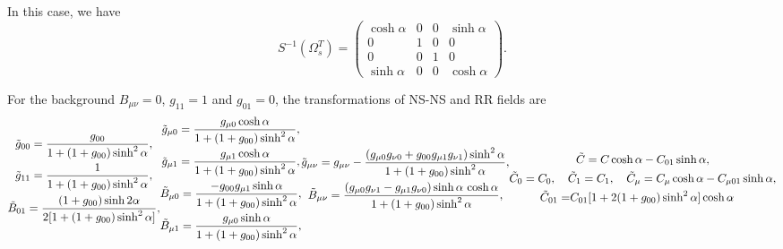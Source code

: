 \documentclass[a4paper,12pt]{article}
\begin{document}
In this case, we have 
\begin{equation}
\label{soluex4b}
S^{-1}(\Omega^T_s)=\begin{pmatrix}
\cosh\alpha & 0 & 0 &\sinh\alpha\\
0 & 1 & 0 & 0\\
0 & 0 & 1 & 0\\
\sinh\alpha & 0 & 0 &\cosh\alpha
\end{pmatrix}.
\end{equation}

For the background $B_{\mu\nu}=0$, $g_{11}=1$ and
$g_{01}=0$, the transformations of NS-NS
and RR fields are
\begin{subequations}
\begin{gather}
\label{gtransfa}
{\tilde g}_{00}={g_{00}\over 1+(1+g_{00})\sinh^2\alpha},\\
\label{gtransfb}
{\tilde g}_{11}={1\over 1+(1+g_{00})\sinh^2\alpha},\\
\label{atransfa}
{\tilde B}_{01}={(1+g_{00})\sinh 2\alpha\over 
2[1+(1+g_{00})\sinh^2\alpha]},
\end{gather}
\begin{gather}
\label{gtransfc}
{\tilde g}_{\mu 0}={g_{\mu 0} \cosh\alpha \over
1+(1+g_{00})\sinh^2\alpha},\\
\label{gtransfd}
{\tilde g}_{\mu 1}={g_{\mu 1} \cosh\alpha \over
1+(1+g_{00})\sinh^2\alpha},\\
\label{atransfb}
{\tilde B}_{\mu 0}={-g_{00}g_{\mu 1}\sinh\alpha
\over 1+(1+g_{00})\sinh^2\alpha},\\
\label{atransff}
{\tilde B}_{\mu 1}={g_{\mu 0}\sinh\alpha\over 
1+(1+g_{00})\sinh^2\alpha},
\end{gather}
\begin{gather}
\label{gtransfe}
{\tilde g}_{\mu\nu}=g_{\mu\nu}-{(g_{\mu 0}
g_{\nu 0}+g_{00}g_{\mu 1}g_{\nu 1})\sinh^2\alpha
\over
1+(1+g_{00})\sinh^2\alpha},\\
\label{atransfc}
{\tilde B}_{\mu\nu}={(g_{\mu 0}g_{\nu 1}
-g_{\mu 1}g_{\nu 0})\sinh\alpha\,\cosh\alpha
\over
1+(1+g_{00})\sinh^2\alpha},
\end{gather}
\begin{gather}
\label{ctransfa}
{\tilde C}=C\cosh\alpha-C_{01}\sinh\alpha,\\
\label{ctransfb}
{\tilde C}_0=C_0,\quad
{\tilde C}_1=C_1,\quad
{\tilde C}_\mu=C_\mu\cosh\alpha-C_{\mu 01}\sinh\alpha,\\
\label{ctransfc}
\begin{split}
{\tilde C}_{01}=& {C_{01}[1+2(1+g_{00})\sinh^2\alpha]\cosh\alpha
}
\end{split}
\end{gather}
\end{subequations}
\end{document}
